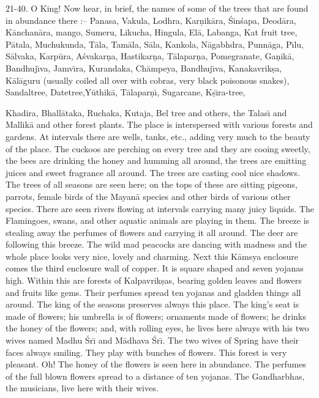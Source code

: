 21-40. O King! Now hear, in brief, the names of some of the trees that are found in abundance there :-- Panasa, Vakula, Lodhra, Kar\d{n}ik\=ara, \'Sin\'sapa, Deod\=ara, K\=anchan\=ara, mango, Sumeru, Likucha, Hingula, El\=a, Labanga, Kat fruit tree, P\=atala, Muchukunda, T\=ala, Tam\=ala, S\=ala, Kankola, N\=agabhdra, Punn\=aga, P\={\i}lu, S\=alvaka, Karp\=ura, A\'svakar\d{n}a, Hastikar\d{n}a, T\=alapar\d{n}a, Pomegranate, Ga\d{n}ik\=a, Bandhuj\={\i}va, Jamv\={\i}ra, Kurandaka, Ch\=ampeya, Bandhuj\={\i}va, Kanakavrik\d{s}a, K\=al\=aguru (usually coiled all over with cobras, very black poisonous snakes), Sandaltree, Datetree,Y\=uthik\=a, T\=alapar\d{n}\={\i}, Sugarcane, K\d{s}\={\i}ra-tree,

Khadira, Bhall\=ataka, Ruchaka, Kutaja, Bel tree and others, the Talas\={\i} and Mallik\=a and other forest plants. The place is interspersed with various forests and gardens. At intervals there are wells, tanks, etc., adding very much to the beauty of the place. The cuckoos are perching on every tree and they are cooing sweetly, the bees are drinking the honey and humming all around, the trees are emitting juices and sweet fragrance all around. The trees are casting cool nice shadows. The trees of all seasons are seen here; on the tops of these are sitting pigeons, parrots, female birds of the Mayan\=a species and other birds of various other species. There are seen rivers flowing at intervals carrying many juicy liquids. The Flamingoes, swans, and other aquatic animals are playing in them. The breeze is stealing away the perfumes of flowers and carrying it all around. The deer are following this breeze. The wild mad peacocks are dancing with madness and the whole place looks very nice, lovely and charming. Next this K\=amsya enclosure comes the third enclosure wall of copper. It is square shaped and seven yojanas high. Within this are forests of Kalpavrik\d{s}as, bearing golden leaves and flowers and fruits like gems. Their perfumes spread ten yojanas and gladden things all around. The king of the seasons preserves always this place. The king's seat is made of flowers; his umbrella is of flowers; ornaments made of flowers; he drinks the honey of the flowers; and, with rolling eyes, he lives here always with his two wives named Madhu \'Sr\={\i} and M\=adhava \'Sr\={\i}. The two wives of Spring have their faces always smiling. They play with bunches of flowers. This forest is very pleasant. Oh! The honey of the flowers is seen here in abundance. The perfumes of the full blown flowers spread to a distance of ten yojanas. The Gandharbhas, the musicians, live here with their wives.

